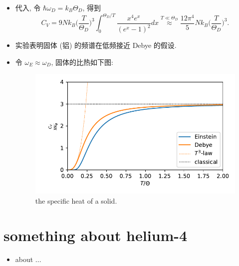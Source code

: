 \begin{itemize}
	\item 代入, 令 $\hbar \omega_D = k_B \Theta_D$, 得到
	\begin{equation}
		C_V = 9 N k_B \Big( \frac{T}{\Theta_D} \Big)^3 \int_0^{\Theta_D / T} \frac{x^4 e^x}{(e^x - 1)^2} dx \overset{T \ll \Theta_D}{\approx} \frac{12 \pi^4}{5} N k_B \Big( \frac{T}{\Theta_D} \Big)^3.
	\end{equation}
	
	\item 实验表明固体 (铝) 的频谱在低频接近 Debye 的假设.
	
	\item 令 $\omega_E \approx \omega_D$, 固体的比热如下图:
	
	\begin{figure}[H]
		\centering
		\includegraphics[scale=0.8]{figures/the specific heat of a solid.pdf}
		\caption{the specific heat of a solid.}
	\end{figure}
\end{itemize}

\section{something about helium-4}
\begin{itemize}
	\item about ...
\end{itemize}
